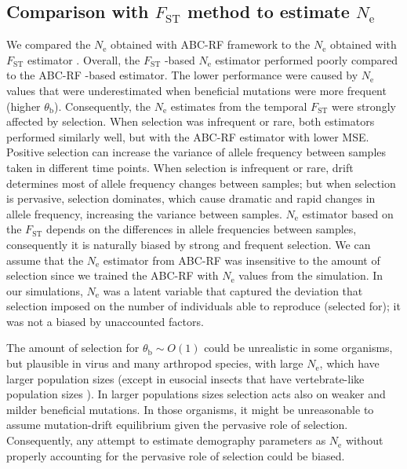 \documentclass[a4paper, 12pt]{article}
\begin{document}
\subsection*{Comparison with $F_{\mathrm{ST}}$ method to estimate $N_\mathrm{e}$}

We compared the $N_{\mathrm{e}}$ obtained with ABC-RF framework to the $N_{\mathrm{e}}$ obtained with $F_{\mathrm{ST}}$ estimator \citep{Skoglund:2014ci, Frachon:2017fw}. Overall, the $F_{\mathrm{ST}}$ -based $N_{\mathrm{e}}$ estimator performed poorly compared to the ABC-RF -based estimator. The lower performance were caused by $N_{\mathrm{e}}$ values that were underestimated when beneficial mutations were more frequent (higher $\theta_{\mathrm{b}}$). Consequently, the $N_{\mathrm{e}}$ estimates from the temporal $F_{\mathrm{ST}}$ were strongly affected by selection. When selection was infrequent or rare, both estimators performed similarly well, but with the ABC-RF estimator with lower MSE. Positive selection can increase the variance of allele frequency between samples taken in different time points. When selection is infrequent or rare, drift determines most of allele frequency changes between samples; but when selection is pervasive, selection dominates, which cause dramatic and rapid changes in allele frequency, increasing the variance between samples. $N_{\mathrm{e}}$ estimator based on the $F_{\mathrm{ST}}$ depends on the differences in allele frequencies between samples, consequently it is naturally biased by strong and frequent selection. We can assume that the $N_{\mathrm{e}}$ estimator from ABC-RF was insensitive to the amount of selection since we trained the ABC-RF with $N_{\mathrm{e}}$ values from the simulation. In our simulations, $N_{\mathrm{e}}$ was a latent variable that captured the deviation that selection imposed on the number of individuals able to reproduce (selected for); it was not a biased by unaccounted factors. 

The amount of selection for $\theta_{\mathrm{b}}\sim O(1)$ could be unrealistic in some organisms, but plausible in virus \citep{Feder:2014fe} and many arthropod species, with large $N_{\mathrm{e}}$, which have larger population sizes (except in eusocial insects that have vertebrate-like population sizes \citet{Romiguier:2014dh}). In larger populations sizes selection acts also on weaker and milder beneficial mutations. In those organisms, it might be unreasonable to assume mutation-drift equilibrium given the pervasive role of selection. Consequently, any attempt to estimate demography parameters as $N_{\mathrm{e}}$ without properly accounting for the pervasive role of selection could be biased.
\end{document}
